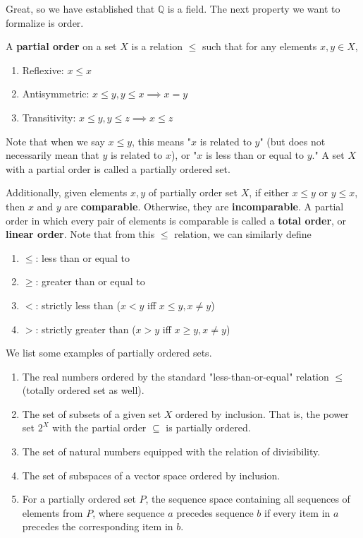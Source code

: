\documentclass{article}
\begin{document}
      Great, so we have established that $\mathbb{Q}$ is a field. The next property we want to formalize is order. 

      \begin{definition}
        A \textbf{partial order} on a set $X$ is a relation $\leq$ such that for any elements $x, y \in X$, 
        \begin{enumerate}
          \item Reflexive: $x \leq x$ 
          \item Antisymmetric: $x \leq y, y \leq x \implies x = y$
          \item Transitivity: $x \leq y, y \leq z \implies x \leq z$
        \end{enumerate}
        Note that when we say $x \leq y$, this means "$x$ is related to $y$" (but does not necessarily mean that $y$ is related to $x$), or "$x$ is less than or equal to $y$." A set $X$ with a partial order is called a partially ordered set. 

        Additionally, given elements $x, y$ of partially order set $X$, if either $x \leq y$ or $y \leq x$, then $x$ and $y$ are \textbf{comparable}. Otherwise, they are \textbf{incomparable}. A partial order in which every pair of elements is comparable is called a \textbf{total order}, or \textbf{linear order}. Note that from this $\leq$ relation, we can similarly define 
        \begin{enumerate}
          \item $\leq$: less than or equal to 
          \item $\geq$: greater than or equal to 
          \item $<$: strictly less than ($x < y$ iff $x\leq y, x \neq y$)
          \item $>$: strictly greater than ($x > y$ iff $x \geq y, x \neq y$)
        \end{enumerate}
      \end{definition} 

      \begin{example}
        We list some examples of partially ordered sets. 
        \begin{enumerate}
          \item The real numbers ordered by the standard "less-than-or-equal" relation $\leq$ (totally ordered set as well). 
          \item The set of subsets of a given set $X$ ordered by inclusion. That is, the power set $2^X$ with the partial order $\subseteq$ is partially ordered. 
          \item The set of natural numbers equipped with the relation of divisibility. 
          \item The set of subspaces of a vector space ordered by inclusion. 
          \item For a partially ordered set $P$, the sequence space containing all sequences of elements from $P$, where sequence $a$ precedes sequence $b$ if every item in $a$ precedes the corresponding item in $b$. 
        \end{enumerate}
      \end{example} 
\end{document}
